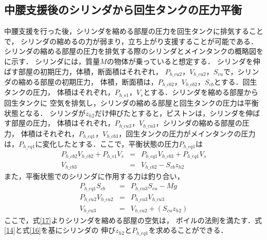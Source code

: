  \subsection{中腰支援後のシリンダから回生タンクの圧力平衡}
 中腰支援を行った後，シリンダを縮める部屋の圧力を回生タンクに排気することで，
 シリンダの縮めるの力が弱まり，立ち上がり支援することが可能である．
 シリンダの縮める部屋の圧力を排気する際のシリンダとメインタンクの概略図を
 に示す．
 シリンダには，質量$M$の物体が乗っていると想定する．
 シリンダを伸ばす部屋の初期圧力，体積，断面積はそれぞれ，
 $P_{h\_cu2}$，$V_{h\_cu2}$，$S_{cu}$で，シリンダの縮める部屋の初期圧力，
 体積，断面積は，$P_{h\_cb2}$，$V_{h\_cb2}$，$S_{cb}$とする．回生タンクの圧力，
 体積はそれぞれ，$P_{h\_s1}$，$V_{s}$とする．シリンダを縮める部屋から回生タンクに
 空気を排気し，シリンダの縮める部屋と回生タンクの圧力は平衡状態となる．
 シリンダが$z_{h2}$だけ伸びたとすると，ピストンは，シリンダを伸ばす部屋の圧力，
 体積はそれぞれ，$P_{h\_cu3}$，$V_{h\_cu3}$，シリンダの縮める部屋の圧力，
 体積はそれぞれ，$P_{h\_eq1}$，$V_{h\_cb3}$，回生タンクの圧力がメインタンクの圧力
 は，$P_{h\_eq1}$に変化したとする．ここで，平衡状態の圧力$P_{h\_eq1}$は
\begin{eqnarray}
         P_{h\_cb2}V_{h\_cb2} + P_{h\_s1}V_{s} &=& P_{h\_eq1}V_{h\_cb3} + P_{h\_eq1}V_{s}\label{14}\\
         V_{h\_cb3} &=& V_{h\_cb2} - S_{cb}z_{h2}
\end{eqnarray}
また，平衡状態でのシリンダに作用する力は釣り合い，
\begin{eqnarray}
         P_{h\_eq1}S_{cb} &=& P_{h\_cu3}S_{cu} - Mg\label{16}\\
         P_{h\_cu2}V_{h\_cu2} &=& P_{h\_cu3}V_{h\_cu3}\label{17}\\
         V_{h\_cu3} &=& V_{h\_cu2} + (S_{cu}z_{h2})
\end{eqnarray}
ここで，式\eqref{17}よりシリンダを縮める部屋の空気は，
ボイルの法則を満たす．式\eqref{14}と式\eqref{16}を基にシリンダの
伸び$z_{h2}$と$P_{h\_eq1}$を求めることができる．
